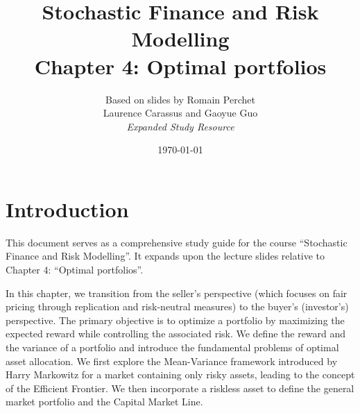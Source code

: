 \documentclass[12pt, a4paper]{report}
\title{\textbf{Stochastic Finance and Risk Modelling} \\ \large Chapter 4: Optimal portfolios}
\author{Based on slides by Romain Perchet \\ Laurence Carassus and Gaoyue Guo \\ \textit{Expanded Study Resource}}
\date{\today}
\theoremstyle{definition}
\begin{document}
\maketitle

\tableofcontents

\chapter*{Introduction}
This document serves as a comprehensive study guide for the course ``Stochastic Finance and Risk Modelling''. It expands upon the lecture slides relative to Chapter 4: ``Optimal portfolios''.

In this chapter, we transition from the seller's perspective (which focuses on fair pricing through replication and risk-neutral measures) to the buyer's (investor's) perspective. The primary objective is to optimize a portfolio by maximizing the expected reward while controlling the associated risk. We define the reward and the variance of a portfolio and introduce the fundamental problems of optimal asset allocation. We first explore the Mean-Variance framework introduced by Harry Markowitz for a market containing only risky assets, leading to the concept of the Efficient Frontier. We then incorporate a riskless asset to define the general market portfolio and the Capital Market Line.




\end{document}
